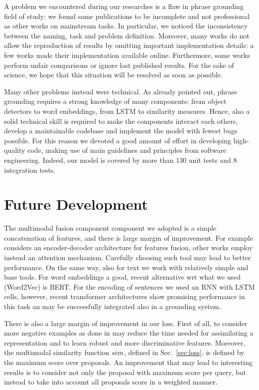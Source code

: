 A problem we encountered during our researches is a flaw in phrase
grounding field of study: we found some publications to be incomplete
and not professional as other works on mainstream tasks. In
particular, we noticed the inconsistency between the naming, task and
problem definition. Moreover, many works do not allow the reproduction
of results by omitting important implementation details: a few works
made their implementation available online. Furthermore, some works
perform unfair comparisons or ignore last published results. For the
sake of science, we hope that this situation will be resolved as soon
as possible.

Many other problems instead were technical. As already pointed out,
phrase grounding requires a strong knowledge of many components: from
object detectors to word embeddings, from LSTM to similarity measures.
Hence, also a solid technical skill is required to make the components
interact each others, develop a maintainable codebase and implement
the model with fewest bugs possible. For this reason we devoted a good
amount of effort in developing high-quality code, making use of main
guidelines and principles from software engineering. Indeed, our model
is covered by more than $130$ unit tests and $8$ integration tests.

\section{Future Development}

The multimodal fusion component component we adopted is a simple
concatenation of features, and there is large margin of improvement.
For example \cite{datta2019align2ground} considers an encoder-decoder
architecture for features fusion, other works employ instead an
attention mechanism. Carefully choosing such tool may lead to better
performance. On the same way, also for text we work with relatively
simple and base tools. For word embeddings a good, recent alternative
wrt what we used (Word2Vec) is BERT. For the encoding of sentences we
used an RNN with LSTM cells, however, recent transformer architectures
show promising performance in this task an may be successfully
integrated also in a grounding system.

There is also a large margin of improvement in our loss. First of all,
to consider more negative examples as done in \cite{wang2020maf} may
reduce the time needed for assimilating a representation and to learn
robust and more discriminative features. Moreover, the multimodal
similarity function $sim$, defined in Sec.~\ref{sec:loss}, is
defined by the maximum score over proposals. An improvement that may
lead to interesting results is to consider not only the proposal with
maximum score per query, but instead to take into account all
proposals score in a weighted manner.

